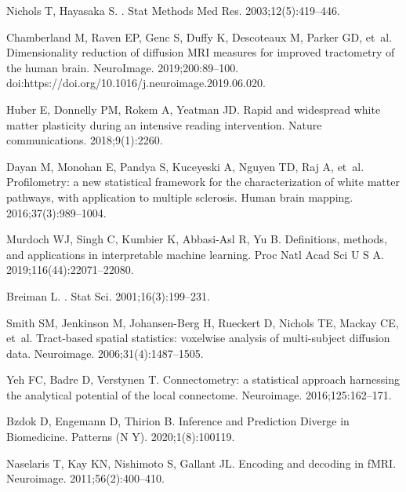 \documentclass[10pt,letterpaper]{article}
\begin{document}
\begin{thebibliography}{100}
Nichols T, Hayasaka S.
.
\newblock Stat Methods Med Res. 2003;12(5):419--446.

Chamberland M, Raven EP, Genc S, Duffy K, Descoteaux M, Parker GD, et~al.
\newblock Dimensionality reduction of diffusion {MRI} measures for improved
  tractometry of the human brain.
\newblock NeuroImage. 2019;200:89--100.
\newblock doi:{https://doi.org/10.1016/j.neuroimage.2019.06.020}.

Huber E, Donnelly PM, Rokem A, Yeatman JD.
\newblock Rapid and widespread white matter plasticity during an intensive
  reading intervention.
\newblock Nature communications. 2018;9(1):2260.

Dayan M, Monohan E, Pandya S, Kuceyeski A, Nguyen TD, Raj A, et~al.
\newblock Profilometry: a new statistical framework for the characterization of
  white matter pathways, with application to multiple sclerosis.
\newblock Human brain mapping. 2016;37(3):989--1004.

Murdoch WJ, Singh C, Kumbier K, Abbasi-Asl R, Yu B.
\newblock Definitions, methods, and applications in interpretable machine
  learning.
\newblock Proc Natl Acad Sci U S A. 2019;116(44):22071--22080.

Breiman L.
.
\newblock Stat Sci. 2001;16(3):199--231.

Smith SM, Jenkinson M, Johansen-Berg H, Rueckert D, Nichols TE, Mackay CE,
  et~al.
\newblock Tract-based spatial statistics: voxelwise analysis of multi-subject
  diffusion data.
\newblock Neuroimage. 2006;31(4):1487--1505.

Yeh FC, Badre D, Verstynen T.
\newblock Connectometry: a statistical approach harnessing the analytical
  potential of the local connectome.
\newblock Neuroimage. 2016;125:162--171.

Bzdok D, Engemann D, Thirion B.
\newblock Inference and Prediction Diverge in Biomedicine.
\newblock Patterns (N Y). 2020;1(8):100119.

Naselaris T, Kay KN, Nishimoto S, Gallant JL.
\newblock Encoding and decoding in {fMRI}.
\newblock Neuroimage. 2011;56(2):400--410.


\end{thebibliography}
\end{document}

